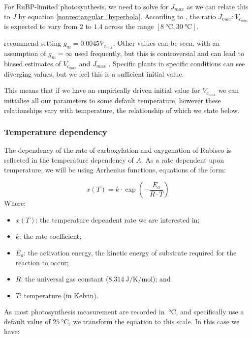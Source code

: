 \documentclass[11pt]{article} %
\newcounter{aside}[section]\setcounter{aside}{0}
\renewcommand{\theaside}{\arabic{section}.\arabic{aside}}
\newenvironment{aside}[1][]{%
\refstepcounter{aside}%
\mdfsetup{%
frametitle={%
\tikz[baseline=(current bounding box.east),outer sep=0pt]
\node[anchor=east,rectangle,fill=blue!20]
{\strut Aside~\theaside};}}
\mdfsetup{innertopmargin=10pt,linecolor=blue!20,%
linewidth=2pt,topline=true,%
frametitleaboveskip=\dimexpr-\ht\strutbox\relax
}
\begin{mdframed}[]\relax%
\label{#1}}{\end{mdframed}}
\begin{document}
For RuBP-limited photosynthesis, we need to solve for $J_{max}$ as we can relate this to $J$ by equation \ref{nonrectangular_hyperbola}. According to \citet{Walcroftresponsephotosyntheticmodel1997}, the ratio $J_{max} : V_{c_{max}}$ is expected to vary from $2$ to $1.4$ across the range $[\SI{8}{\celsius}, \SI{30}{\celsius}]$.

\citet{EvansCarbonDioxideDiffusion1996} recommend setting $g_m =  0.0045V_{c_{max}}$. Other values can be seen, with an assumption of $g_m = \infty$ used frequently, but this is controversial and can lead to biased estimates of $V_{c_{max}}$ and $J_{max}$ \cite{YinTheoreticalreconsiderationswhen2009}. Specific plants in specific conditions can see diverging values, but we feel this is a sufficient initial value.

This means that if we have an empirically driven initial value for $V_{c_{max}}$ we can initialise all our parameters to some default temperature, however these relationships vary with temperature, the relationship of which we state below.



\subsubsection{Temperature dependency}
The dependency of the rate of carboxylation and oxygenation of Rubisco is reflected in the temperature dependency of $A$. As a rate dependent upon temperature, we will be using Arrhenius functions, equations of the form:

\begin{equation} \label{arrhenius_eqn_kelvin}
x(T) = k \cdot \exp \left(-\frac{E_a}{R \cdot T}\right)
\end{equation}
Where:
\begin{itemize}
 \item $x(T)$: the temperature dependent rate we are interested in;
 \item $k$: the rate coefficient;
 \item $E_a$: the activation energy, the kinetic energy of substrate required for the reaction to occur;
 \item $R$: the universal gas constant ($\SI{8.314}{\J \per \K \per \mol}$); and
 \item $T$: temperature (in Kelvin).
\end{itemize}
As most photosynthesis measurement are recorded in $\SI{}{\celsius}$, and specifically use a default value of $\SI{25}{\celsius}$, we transform the equation to this scale. In this case we have:
\end{document}
